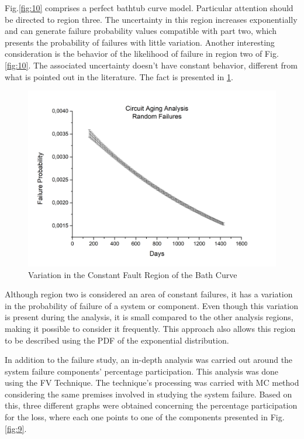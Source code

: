 \documentclass{ws-m3as}
\begin{document}
Fig.\ref{fig:10} comprises a perfect bathtub curve model. Particular attention should be directed to region three. The uncertainty in this region increases exponentially and can generate failure probability values compatible with part two, which presents the probability of failures with little variation. Another interesting consideration is the behavior of the likelihood of failure in region two of Fig.\ref{fig:10}. The associated uncertainty doesn't have constant behavior, different from what is pointed out in the literature. The fact is presented in \ref{fig:11}.
  
\begin{figure} [H]
	\centering
	\includegraphics[width=0.75\linewidth]{"Figures/Circuit Failure Probability Regiao 2"}
	\caption{Variation in the Constant Fault Region of the Bath Curve}
	\label{fig:circuit-failure-probability-regiao-2}
	\label{fig:11}	
\end{figure}

Although region two is considered an area of constant failures, it has a variation in the probability of failure of a system or component. Even though this variation is present during the analysis, it is small compared to the other analysis regions, making it possible to consider it frequently. This approach also allows this region to be described using the PDF of the exponential distribution.

In addition to the failure study, an in-depth analysis was carried out around the system failure components' percentage participation. This analysis was done using the FV Technique. The technique's processing was carried with MC method considering the same premises involved in studying the system failure. Based on this, three different graphs were obtained concerning the percentage participation for the loss, where each one points to one of the components presented in Fig.\ref{fig:9}. 
\end{document}
